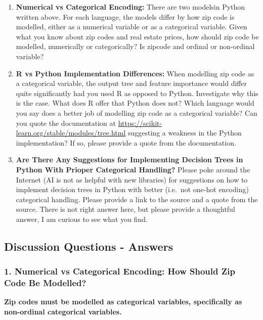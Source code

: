 \documentclass[
  letterpaper,
  DIV=11,
  numbers=noendperiod]{scrartcl}
\begin{document}
\begin{enumerate}
\def\labelenumi{\arabic{enumi}.}
\item
  \textbf{Numerical vs Categorical Encoding:} There are two modelsin
  Python written above. For each language, the models differ by how zip
  code is modelled, either as a numerical variable or as a categorical
  variable. Given what you know about zip codes and real estate prices,
  how should zip code be modelled, numerically or categorically? Is
  zipcode and ordinal or non-ordinal variable?
\item
  \textbf{R vs Python Implementation Differences:} When modelling zip
  code as a categorical variable, the output tree and feature importance
  would differ quite significantly had you used R as opposed to Python.
  Investigate why this is the case. What does R offer that Python does
  not? Which language would you say does a better job of modelling zip
  code as a categorical variable? Can you quote the documentation at
  \url{https://scikit-learn.org/stable/modules/tree.html} suggesting a
  weakness in the Python implementation? If so, please provide a quote
  from the documentation.
\item
  \textbf{Are There Any Suggestions for Implementing Decision Trees in
  Python With Prioper Categorical Handling?} Please poke around the
  Internet (AI is not as helpful with new libraries) for suggestions on
  how to implement decision trees in Python with better (i.e.~not
  one-hot encoding) categorical handling. Please provide a link to the
  source and a quote from the source. There is not right answer here,
  but please provide a thoughtful answer, I am curious to see what you
  find.
\end{enumerate}

\subsection{Discussion Questions -
Answers}\label{discussion-questions---answers}

\subsubsection{1. Numerical vs Categorical Encoding: How Should Zip Code
Be
Modelled?}\label{numerical-vs-categorical-encoding-how-should-zip-code-be-modelled}

\textbf{Zip codes must be modelled as categorical variables,
specifically as non-ordinal categorical variables.}
\end{document}
